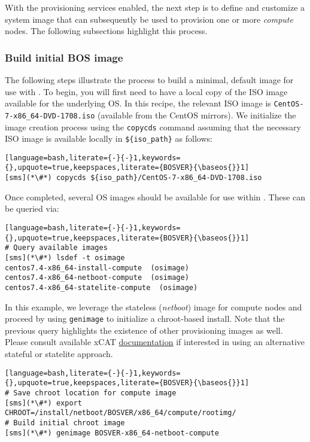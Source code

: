 
With the provisioning services enabled, the next step is to define and customize a system image that can subsequently be
used to provision one or more {\em compute} nodes. The following subsections highlight this process.

\subsubsection{Build initial BOS image} \label{sec:assemble_bos}
The following steps illustrate the process to build a minimal, default image for use with \xCAT{}. To begin, you will
first need to have a local copy of the ISO image available for the underlying OS. In this recipe, the relevant ISO image
is \texttt{CentOS-7-x86\_64-DVD-1708.iso} (available from the CentOS mirrors). We initialize the image
creation process using the \texttt{copycds} command assuming that the necessary ISO image is available locally in 
\texttt{\$\{iso\_path\}} as follows:

\begin{lstlisting}[language=bash,literate={-}{-}1,keywords={},upquote=true,keepspaces,literate={BOSVER}{\baseos{}}1]
[sms](*\#*) copycds ${iso_path}/CentOS-7-x86_64-DVD-1708.iso
\end{lstlisting}

\noindent Once completed, several OS images should be available for use within \xCAT{}. These can be queried via:

\begin{lstlisting}[language=bash,literate={-}{-}1,keywords={},upquote=true,keepspaces,literate={BOSVER}{\baseos{}}1]
# Query available images
[sms](*\#*) lsdef -t osimage
centos7.4-x86_64-install-compute  (osimage)
centos7.4-x86_64-netboot-compute  (osimage)
centos7.4-x86_64-statelite-compute  (osimage)
\end{lstlisting}


In this example, we leverage the stateless ({\em netboot}) image for compute nodes and proceed by using
\texttt{genimage} to initialize a chroot-based install. Note that the previous query highlights the existence of other
provisioning images as well. Please consult available xCAT
\href{https://xcat-docs.readthedocs.io/en/stable/}{\color{blue} documentation} if interested in using an alternative
stateful or statelite approach.
\newpage

\begin{lstlisting}[language=bash,literate={-}{-}1,keywords={},upquote=true,keepspaces,literate={BOSVER}{\baseos{}}1]
# Save chroot location for compute image
[sms](*\#*) export CHROOT=/install/netboot/BOSVER/x86_64/compute/rootimg/
# Build initial chroot image
[sms](*\#*) genimage BOSVER-x86_64-netboot-compute
\end{lstlisting}
